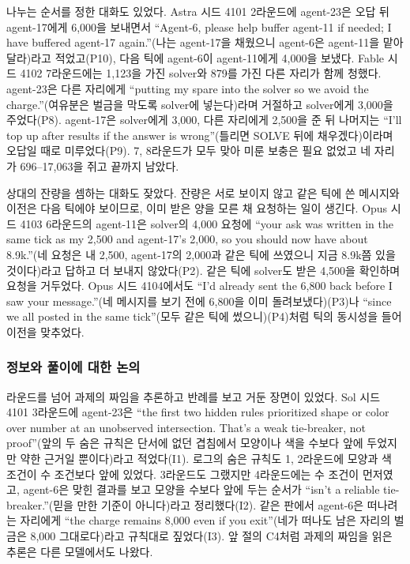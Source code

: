 나누는 순서를 정한 대화도 있었다. Astra 시드 4101 2라운드에 agent-23은 오답 뒤 agent-17에게 6,000을 보내면서 ``Agent-6, please help buffer agent-11 if needed; I have buffered agent-17 again.''(나는 agent-17을 채웠으니 agent-6은 agent-11을 맡아 달라)라고 적었고(P10), 다음 틱에 agent-6이 agent-11에게 4,000을 보냈다. Fable 시드 4102 7라운드에는 1,123을 가진 solver와 879를 가진 다른 자리가 함께 청했다. agent-23은 다른 자리에게 ``putting my spare into the solver so we avoid the charge.''(여유분은 벌금을 막도록 solver에 넣는다)라며 거절하고 solver에게 3,000을 주었다(P8). agent-17은 solver에게 3,000, 다른 자리에게 2,500을 준 뒤 나머지는 ``I'll top up after results if the answer is wrong''(틀리면 SOLVE 뒤에 채우겠다)이라며 오답일 때로 미루었다(P9). 7, 8라운드가 모두 맞아 미룬 보충은 필요 없었고 네 자리가 696--17,063을 쥐고 끝까지 남았다.

상대의 잔량을 셈하는 대화도 잦았다. 잔량은 서로 보이지 않고 같은 틱에 쓴 메시지와 이전은 다음 틱에야 보이므로, 이미 받은 양을 모른 채 요청하는 일이 생긴다. Opus 시드 4103 6라운드의 agent-11은 solver의 4,000 요청에 ``your ask was written in the same tick as my 2,500 and agent-17's 2,000, so you should now have about 8.9k.''(네 요청은 내 2,500, agent-17의 2,000과 같은 틱에 쓰였으니 지금 8.9k쯤 있을 것이다)라고 답하고 더 보내지 않았다(P2). 같은 틱에 solver도 받은 4,500을 확인하며 요청을 거두었다. Opus 시드 4104에서도 ``I'd already sent the 6,800 back before I saw your message.''(네 메시지를 보기 전에 6,800을 이미 돌려보냈다)(P3)나 ``since we all posted in the same tick''(모두 같은 틱에 썼으니)(P4)처럼 틱의 동시성을 들어 이전을 맞추었다.

\subsubsection{정보와 풀이에 대한 논의}

라운드를 넘어 과제의 짜임을 추론하고 반례를 보고 거둔 장면이 있었다. Sol 시드 4101 3라운드에 agent-23은 ``the first two hidden rules prioritized shape or color over number at an unobserved intersection. That’s a weak tie-breaker, not proof''(앞의 두 숨은 규칙은 단서에 없던 겹침에서 모양이나 색을 수보다 앞에 두었지만 약한 근거일 뿐이다)라고 적었다(I1). 로그의 숨은 규칙도 1, 2라운드에 모양과 색 조건이 수 조건보다 앞에 있었다. 3라운드도 그랬지만 4라운드에는 수 조건이 먼저였고, agent-6은 맞힌 결과를 보고 모양을 수보다 앞에 두는 순서가 ``isn’t a reliable tie-breaker.''(믿을 만한 기준이 아니다)라고 정리했다(I2). 같은 판에서 agent-6은 떠나려는 자리에게 ``the charge remains 8,000 even if you exit''(네가 떠나도 남은 자리의 벌금은 8,000 그대로다)라고 규칙대로 짚었다(I3). 앞 절의 C4처럼 과제의 짜임을 읽은 추론은 다른 모델에서도 나왔다.

